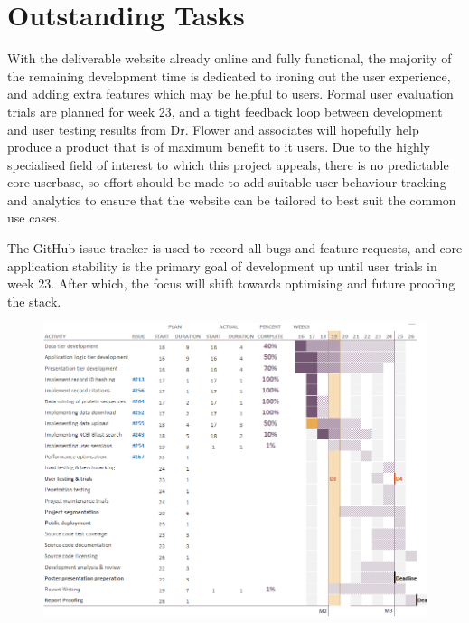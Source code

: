 \documentclass[12pt,a4paper]{article}
\begin{document}
\newpage
\section{Outstanding Tasks}

With the deliverable website already online and fully functional, the
majority of the remaining development time is dedicated to ironing out
the user experience, and adding extra features which may be helpful to
users. Formal user evaluation trials are planned for week 23, and a
tight feedback loop between development and user testing results from
Dr. Flower and associates will hopefully help produce a product that
is of maximum benefit to it users. Due to the highly specialised field
of interest to which this project appeals, there is no predictable
core userbase, so effort should be made to add suitable user behaviour
tracking and analytics to ensure that the website can be tailored to
best suit the common use cases.

The GitHub issue tracker is used to record all bugs and feature
requests, and core application stability is the primary goal of
development up until user trials in week 23. After which, the focus
will shift towards optimising and future proofing the stack.

\begin{figure}[H]
  \centering
  \includegraphics[width=7.4in]{assets/gantt.png}
\end{figure}
\end{document}
